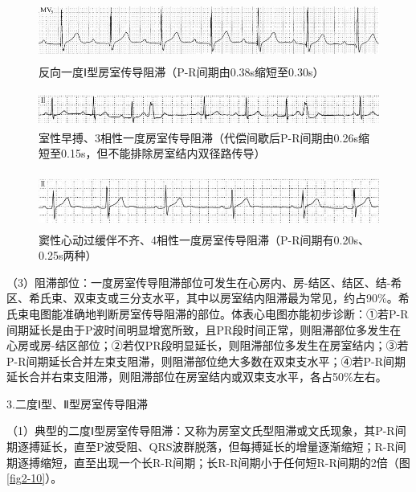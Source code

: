 \begin{figure}[!htbp]
 \centering
 \includegraphics[width=5.58333in,height=0.78125in]{./images/Image00042.jpg}
 \captionsetup{justification=centering}
 \caption{反向一度Ⅰ型房室传导阻滞（P-R间期由0.38s缩短至0.30s）}
 \label{fig2-7}
  \end{figure} 

\begin{figure}[!htbp]
 \centering
 \includegraphics[width=5.58333in,height=0.45833in]{./images/Image00043.jpg}
 \captionsetup{justification=centering}
 \caption{室性早搏、3相性一度房室传导阻滞（代偿间歇后P-R间期由0.26s缩短至0.15s，但不能排除房室结内双径路传导）}
 \label{fig2-8}
  \end{figure} 

\begin{figure}[!htbp]
 \centering
 \includegraphics[width=5.58333in,height=0.71875in]{./images/Image00044.jpg}
 \captionsetup{justification=centering}
 \caption{窦性心动过缓伴不齐、4相性一度房室传导阻滞（P-R间期有0.20s、0.25s两种）}
 \label{fig2-9}
  \end{figure} 

（3）阻滞部位：一度房室传导阻滞部位可发生在心房内、房-结区、结区、结-希区、希氏束、双束支或三分支水平，其中以房室结内阻滞最为常见，约占90\%。希氏束电图能准确地判断房室传导阻滞的部位。体表心电图亦能初步诊断：①若P-R间期延长是由于P波时间明显增宽所致，且PR段时间正常，则阻滞部位多发生在心房或房-结区部位；②若仅PR段明显延长，则阻滞部位多发生在房室结内；③若P-R间期延长合并左束支阻滞，则阻滞部位绝大多数在双束支水平；④若P-R间期延长合并右束支阻滞，则阻滞部位在房室结内或双束支水平，各占50\%左右。

3.二度Ⅰ型、Ⅱ型房室传导阻滞

（1）典型的二度Ⅰ型房室传导阻滞：又称为房室文氏型阻滞或文氏现象，其P-R间期逐搏延长，直至P波受阻、QRS波群脱落，但每搏延长的增量逐渐缩短；R-R间期逐搏缩短，直至出现一个长R-R间期；长R-R间期小于任何短R-R间期的2倍（图\ref{fig2-10}）。

